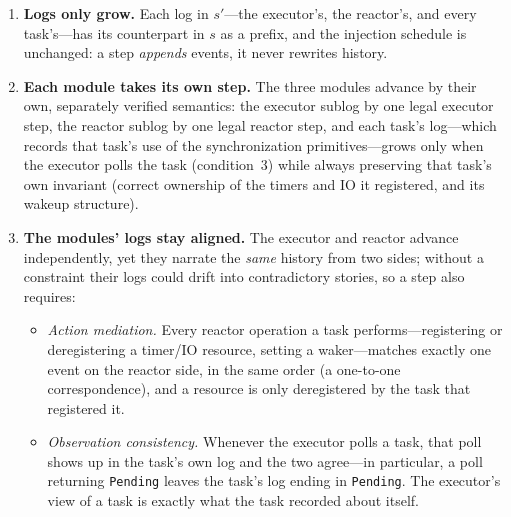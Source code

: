 \documentclass[11pt]{article}
\theoremstyle{plain}
\theoremstyle{definition}
\begin{document}
\begin{enumerate}
\item \textbf{Logs only grow.} Each log in $s'$---the executor's, the reactor's, and every
task's---has its counterpart in $s$ as a prefix, and the injection schedule is unchanged:
a step \emph{appends} events, it never rewrites history.

\item \textbf{Each module takes its own step.} The three modules advance by their own,
separately verified semantics: the executor sublog by one legal executor step, the reactor
sublog by one legal reactor step, and each task's log---which records that task's use of
the synchronization primitives---grows only when the executor polls the task (condition~3)
while always preserving that task's own invariant (correct ownership of the timers and IO
it registered, and its wakeup structure).

\item \textbf{The modules' logs stay aligned.} The executor and reactor advance
independently, yet they narrate the \emph{same} history from two sides; without a
constraint their logs could drift into contradictory stories, so a step also requires:
  \begin{itemize}
  \item \emph{Action mediation.} Every reactor operation a task performs---registering or
    deregistering a timer/IO resource, setting a waker---matches exactly one event on the
    reactor side, in the same order (a one-to-one correspondence), and a resource is only
    deregistered by the task that registered it.
  \item \emph{Observation consistency.} Whenever the executor polls a task, that poll
    shows up in the task's own log and the two agree---in particular, a poll returning
    \texttt{Pending} leaves the task's log ending in \texttt{Pending}. The executor's view
    of a task is exactly what the task recorded about itself.
  \end{itemize}


\end{enumerate}
\end{document}
